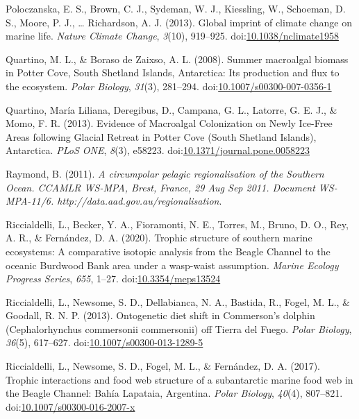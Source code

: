 \documentclass[
]{article}
\newlength{\cslhangindent}
\newlength{\cslentryspacingunit} %
\newenvironment{CSLReferences}[2] %
 {%
  \setlength{\parindent}{0pt}
  \ifodd #1
  \let\oldpar\par
  \def\par{\hangindent=\cslhangindent\oldpar}
  \fi
  \setlength{\parskip}{#2\cslentryspacingunit}
 }%
 {}
\begin{document}
\begin{CSLReferences}{1}{0}
\leavevmode{}%
Poloczanska, E. S., Brown, C. J., Sydeman, W. J., Kiessling, W.,
Schoeman, D. S., Moore, P. J., \ldots{} Richardson, A. J. (2013). Global
imprint of climate change on marine life. \emph{Nature Climate Change},
\emph{3}(10), 919--925.
doi:\href{https://doi.org/10.1038/nclimate1958}{10.1038/nclimate1958}

\leavevmode{}%
Quartino, M. L., \& Boraso de Zaixso, A. L. (2008). Summer macroalgal
biomass in {Potter Cove}, {South Shetland Islands}, {Antarctica}: Its
production and flux to the ecosystem. \emph{Polar Biology},
\emph{31}(3), 281--294.
doi:\href{https://doi.org/10.1007/s00300-007-0356-1}{10.1007/s00300-007-0356-1}

\leavevmode{}%
Quartino, María Liliana, Deregibus, D., Campana, G. L., Latorre, G. E.
J., \& Momo, F. R. (2013). Evidence of {Macroalgal Colonization} on
{Newly Ice-Free Areas} following {Glacial Retreat} in {Potter Cove}
({South Shetland Islands}), {Antarctica}. \emph{PLoS ONE}, \emph{8}(3),
e58223.
doi:\href{https://doi.org/10.1371/journal.pone.0058223}{10.1371/journal.pone.0058223}

\leavevmode{}%
Raymond, B. (2011). \emph{A circumpolar pelagic regionalisation of the
{Southern Ocean}. {CCAMLR WS-MPA}, {Brest}, {France}, 29
{Aug} {Sep} 2011. {Document WS-MPA-11}/6.
{http://data.aad.gov.au/regionalisation}}.

\leavevmode{}%
Riccialdelli, L., Becker, Y. A., Fioramonti, N. E., Torres, M., Bruno,
D. O., Rey, A. R., \& Fernández, D. A. (2020). Trophic structure of
southern marine ecosystems: A comparative isotopic analysis from the
{Beagle Channel} to the oceanic {Burdwood Bank} area under a wasp-waist
assumption. \emph{Marine Ecology Progress Series}, \emph{655}, 1--27.
doi:\href{https://doi.org/10.3354/meps13524}{10.3354/meps13524}

\leavevmode{}%
Riccialdelli, L., Newsome, S. D., Dellabianca, N. A., Bastida, R.,
Fogel, M. L., \& Goodall, R. N. P. (2013). Ontogenetic diet shift in
{Commerson}'s dolphin ({Cephalorhynchus} commersonii commersonii) off
{Tierra} del {Fuego}. \emph{Polar Biology}, \emph{36}(5), 617--627.
doi:\href{https://doi.org/10.1007/s00300-013-1289-5}{10.1007/s00300-013-1289-5}

\leavevmode{}%
Riccialdelli, L., Newsome, S. D., Fogel, M. L., \& Fernández, D. A.
(2017). Trophic interactions and food web structure of a subantarctic
marine food web in the {Beagle Channel}: {Bahía Lapataia}, {Argentina}.
\emph{Polar Biology}, \emph{40}(4), 807--821.
doi:\href{https://doi.org/10.1007/s00300-016-2007-x}{10.1007/s00300-016-2007-x}


\end{CSLReferences}
\end{document}
